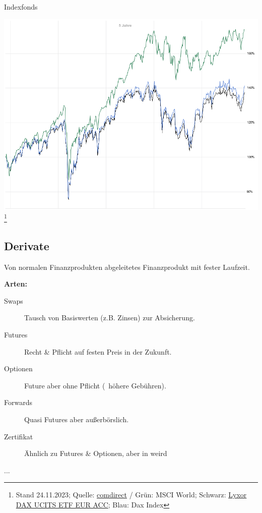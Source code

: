 \documentclass{beamer}
\begin{document}
			\begin{frame}{Indexfonds}
				\begin{center}
					\includegraphics[height=0.75\textheight,trim=0 0 0 0.5cm]{images/dax-etf-benchmark}\footnote{Stand 24.11.2023; Quelle: \href{https://charts.comdirect.de/charts/benchmark_underlying.chart?HEIGHT=600&WIDTH=800&ID_BENCH1=20735&ID_BENCH2=12221463&ID_NOTATION=17138767&TIME_SPAN=5Y}{comdirect} / Grün: MSCI World; Schwarz: \href{https://www.comdirect.de/inf/etfs/LU0252633754}{Lyxor DAX UCITS ETF EUR ACC}; Blau: Dax Index}\\
				\end{center}
			\end{frame}
		
		\subsection{Derivate}
		
			\begin{frame}
				\begin{definition}
					Von normalen Finanzprodukten abgeleitetes Finanzprodukt mit fester Laufzeit.
				\end{definition}
				\textbf{Arten:}
				\begin{description}
					\item[Swaps] Tausch von Basiswerten (z.B. Zinsen) zur Absicherung.
					\item[Futures] Recht \& Pflicht auf festen Preis in der Zukunft.
					\item[Optionen] Future aber ohne Pflicht (\textrightarrow\ höhere Gebühren).
					\item[Forwards] Quasi Futures aber außerbörslich.
					\item[Zertifikat] Ähnlich zu Futures \& Optionen, aber in weird
					\item[...]
				\end{description}
			\end{frame}
		
\end{document}
